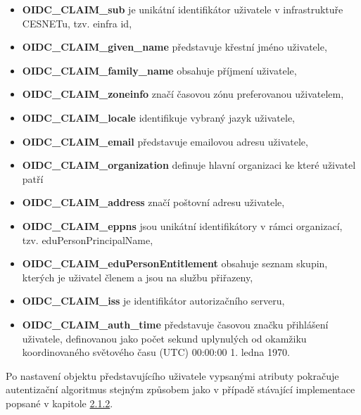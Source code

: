 \documentclass[
  printed, %
  twoside, %
  table,   %
  nolof,     %
  nolot,     %
]{fithesis3}
\begin{document}
\begin{itemize}
    \item \textbf{OIDC\_CLAIM\_sub} je unikátní identifikátor uživatele v infrastruktuře CESNETu, tzv. einfra id,
    \item \textbf{OIDC\_CLAIM\_given\_name} představuje křestní jméno uživatele,
    \item \textbf{OIDC\_CLAIM\_family\_name} obsahuje příjmení uživatele,
    \item \textbf{OIDC\_CLAIM\_zoneinfo} značí časovou zónu preferovanou uživatelem, 
    \item \textbf{OIDC\_CLAIM\_locale} identifikuje vybraný jazyk uživatele,
    \item \textbf{OIDC\_CLAIM\_email} představuje emailovou adresu uživatele,
    \item \textbf{OIDC\_CLAIM\_organization} definuje hlavní organizaci ke které uživatel patří
    \item \textbf{OIDC\_CLAIM\_address} značí poštovní adresu uživatele,
    \item \textbf{OIDC\_CLAIM\_eppns} jsou unikátní identifikátory v rámci organizací, tzv. eduPersonPrincipalName, 
    \item \textbf{OIDC\_CLAIM\_eduPersonEntitlement} obsahuje seznam skupin, kterých je uživatel členem a jsou na službu přiřazeny,
    \item \textbf{OIDC\_CLAIM\_iss} je identifikátor autorizačního serveru,
    \item \textbf{OIDC\_CLAIM\_auth\_time} představuje časovou značku přihlášení uživatele, definovanou jako počet sekund uplynulých od okamžiku koordinovaného světového času (UTC) 00:00:00 1. ledna 1970.
\end{itemize}

Po nastavení objektu představujícího uživatele vypsanými atributy pokračuje autentizační algoritmus stejným způsobem jako v případě stávající implementace popsané v kapitole \hyperref[meetings-old]{2.1.2}.
\end{document}
